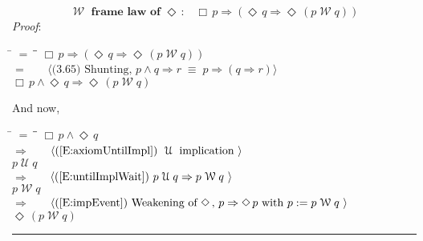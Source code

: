 \documentclass[12pt, fleqn, leqno]{article}
\newcommand{\lgap}{2pt}                             %
\newcommand{\mymathindent}{24pt}                    %
\newcommand{\equivs}{\ensuremath{\;\equiv\;}}       %
\newcommand{\impl}{\ensuremath{\Rightarrow}}        %
\newcommand{\Until}{\;\mathcal{U}\;}
\newcommand{\Wait}{\;\mathcal{W}\;}
\newcommand{\Event}{\Diamond\,}
\newcommand{\Always}{\Box\,}
\newcommand{\myqed}{\rule[-.23ex]{1.2ex}{2.0ex}}
\newcommand{\myqedtab}{\hspace{384pt}}              %
\newcommand{\Gll} {\langle}                         %
\newcommand{\Ggg} {\rangle}                         %
\newcommand{\Hint}[1]     {\ \ \ $\Gll              \mbox{#1} \Ggg$ }   %
\begin{document}
\begin{equation}\label{E:waitframelawEvent}
\textbf{$\Wait$ frame law of $\Event$:}\quad \Always p \impl (\Event q \impl \Event (p \Wait q))
\end{equation}
\emph{Proof}:
\begin{tabbing}
\hspace{\mymathindent} \= $= \;$ \= \myqedtab \= \kill
  \> \>   $\Always p \impl (\Event q \impl \Event (p \Wait q))$\\[\lgap]
  \> $=$  \>  \Hint{(3.65) Shunting, $p\land q\impl r\equivs p\impl (q\impl r)$}\\[\lgap]
  \> \>   $\Always p \land \Event q \impl \Event (p \Wait q)$
\end{tabbing}
And now,
\begin{tabbing}
\hspace{\mymathindent} \= $= \;$ \= \myqedtab \= \kill
  \> \>   $\Always p \land \Event q $\\[\lgap]
   \> $\impl$ \> \Hint{(\ref{E:axiomUntilImpl}) $\Until$ implication } \\[\lgap]
   \> \>   $p \Until q $\\[\lgap]
   \> $\impl$ \> \Hint{(\ref{E:untilImplWait}) $p\Until q\impl p\Wait q$ } \\[\lgap]
   \> \>   $p \Wait q $\\[\lgap]
  \> $\impl$  \>  \Hint{(\ref{E:impEvent}) Weakening of $\Event$, $p \impl \Event p$ with $p := p \Wait q$ }\\[\lgap]
  \> \>   $\Event (p \Wait q) $\quad \myqed
\end{tabbing}
\end{document}
